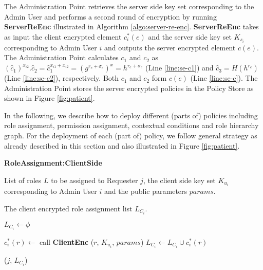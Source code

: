 \documentclass[final,5p,times,twocolumn]{elsarticle}
\newcommand{\algofontsize}{\fontsize{7}{8}\selectfont}
\begin{document}
The Administration Point retrieves the server side key set corresponding to the Admin User and performs a second round of encryption by running \textbf{ServerReEnc} illustrated in Algorithm \ref{algo:server-re-enc}. \textbf{ServerReEnc} takes as input the client encrypted element $c^*_i (e)$ and the server side key set $K_{s_i}$ corresponding to Admin User $i$ and outputs the server encrypted element $c(e)$. The Administration Point calculates $c_1$ and $c_2$ as $(\hat{c}_1)^{x_{i2}}.\hat{c}_2 = \hat{c}_1^{x_{i1}+x_{i2}} = (g^{r_e+{\sigma}_e})^x = h^{r_e+{\sigma}_e}$ (Line \ref{line:se-c1}) and $\hat{c}_3 = H(h^{r_e})$ (Line \ref{line:se-c2}), respectively. Both $c_1$ and $c_2$ form $c(e)$ (Line \ref{line:se-c}). The Administration Point stores the server encrypted policies in the Policy Store as shown in Figure \ref{fig:patient}.

In the following, we describe how to deploy different (parts of) policies including role assignment, permission assignment, contextual conditions and role hierarchy graph. For the deployment of each (part of) policy, we follow general strategy as already described in this section and also illustrated in Figure \ref{fig:patient}.





\begin{algorithm}[htp]
{\algofontsize
\caption{\textbf{RoleAssignment:ClientSide}}

\label{algo:deploy-role-assignment-client-side}

\begin{algorithmic}[1]

\REQUIRE List of roles $L$ to be assigned to Requester $j$, the client side key set $K_{u_i}$ corresponding to Admin User $i$ and the public parameters $params$.

\ENSURE The client encrypted role assignment list $L_{C_i}$.

\medskip

\STATE $L_{C_i} \leftarrow \phi$ \label{line:deploy-ra-cs-init}

 \label{line:deploy-ra-cs-loop}

	\STATE $c^*_i (r) \leftarrow$ call \textbf{ClientEnc} ($r$, $K_{u_i}$, $params$) {\algofontsize {}} \label{line:deploy-ra-cs-call-enc}
	\STATE $L_{C_i} \leftarrow L_{C_i} \cup c^*_i (r)$ \label{line:deploy-ra-cs-update}

\ENDFOR

\RETURN ($j$, $L_{C_i}$)

\end{algorithmic}
}
\end{algorithm}
\end{document}
